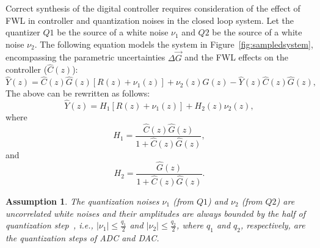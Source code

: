 \documentclass{sig-alternate-05-2015}
\newtheorem{myassumption}{Assumption}
\begin{document}
Correct synthesis of the digital controller requires consideration of the
effect of FWL in controller and quantization noises in the closed loop
system.  Let the quantizer $Q1$ be the source of a white noise $\nu_{1}$ and
$Q2$ be the source of a white noise $\nu_{2}$.  The following equation
models the system in Figure~\ref{fig:sampledsystem}, encompassing the
parametric uncertainties $\Delta \vec{G}$ and the FWL effects on
the controller ($\hat{C}(z)$):
%
\begin{equation}
\hat{Y}(z)=\hat{C}(z)\hat{G}(z)[R(z)+\nu_{1}(z)]+\nu_{2}(z)\hat{G}(z)-\hat{Y}(z)\hat{C}(z)\hat{G}(z),
\end{equation}
%
The above can be rewritten as follows:
%
\begin{equation}
\label{eq:outputfunctions}
\hat{Y}(z)=H_{1}[R(z)+\nu_{1}(z)]+H_{2}(z)\nu_{2}(z),
\end{equation}
%
where
%
\begin{equation}
H_{1}=\frac{\hat{C}(z)\hat{G}(z)}{1+\hat{C}(z)\hat{G}(z)},
\end{equation}
%
and
%
\begin{equation}
H_{2}=\frac{\hat{G}(z)}{1+\hat{C}(z)\hat{G}(z)}.
\end{equation}

\begin{myassumption}
\label{whitenoise}
%
The quantization noises $\nu_{1}$ (from $Q1$) and $\nu_{2}$ (from $Q2$) are
uncorrelated white noises and their amplitudes are always bounded by the
half of quantization step~\cite{astrom1997computer}, i.e., $\vert \nu_{1}
\vert \leq \frac{q_{1}}{2}$ and $\vert \nu_{2} \vert \leq \frac{q_{2}}{2}$,
where $q_{1}$ and $q_{2}$, respectively, are the quantization steps of ADC
and DAC.
% 
\end{myassumption}
\end{document}
